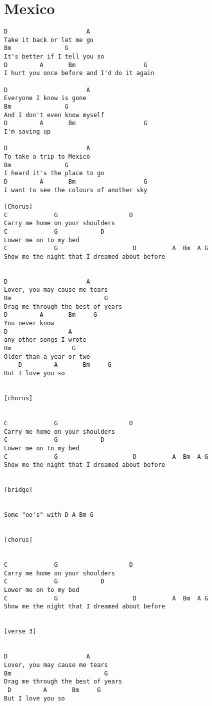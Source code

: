 \documentclass[leqno]{memoir}
\begin{document}
\chapter{Mexico}
\begin{verbatim}
D                      A
Take it back or let me go
Bm               G
It's better if I tell you so
D         A       Bm                   G
I hurt you once before and I'd do it again

D                      A
Everyone I know is gone
Bm               G
And I don't even know myself
D         A       Bm                   G
I'm saving up

D                      A
To take a trip to Mexico
Bm               G
I heard it's the place to go
D         A       Bm                   G
I want to see the colours of another sky

[Chorus]
C             G                    D
Carry me home on your shoulders
C             G            D
Lower me on to my bed
C             G                     D          A  Bm  A G
Show me the night that I dreamed about before


D                      A
Lover, you may cause me tears
Bm                          G
Drag me through the best of years
D         A       Bm     G
You never know 
D                 A
any other songs I wrote
Bm                 G
Older than a year or two 
    D         A       Bm     G
But I love you so


[chorus]


C             G                    D
Carry me home on your shoulders
C             G            D
Lower me on to my bed
C             G                     D          A  Bm  A G
Show me the night that I dreamed about before


[bridge]


Some "oo's" with D A Bm G


[chorus]


C             G                    D
Carry me home on your shoulders
C             G            D
Lower me on to my bed
C             G                     D          A  Bm  A G
Show me the night that I dreamed about before


[verse 3]


D                      A
Lover, you may cause me tears
Bm                          G
Drag me through the best of years
 D         A       Bm     G
But I love you so
\end{verbatim}
\newpage
\end{document}
